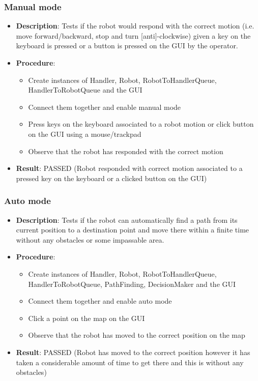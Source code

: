 \documentclass[12pt,a4paper]{article}
\begin{document}
	\subsubsection{Manual mode}
	\begin{itemize}
		\item \textbf{Description}:	Tests if the robot would respond with the correct motion (i.e. move forward/backward, stop and turn [anti]-clockwise) given a key on the keyboard is pressed or a button is pressed on the GUI by the operator.
		\item \textbf{Procedure}:
		\begin{itemize}
			\item Create instances of Handler, Robot, RobotToHandlerQueue, HandlerToRobotQueue and the GUI
			\item Connect them together and enable manual mode
			\item Press keys on the keyboard associated to a robot motion or click button on the GUI using a mouse/trackpad
			\item Observe that the robot has responded with the correct motion
		\end{itemize}
		\item \textbf{Result}:		PASSED (Robot responded with correct motion associated to a pressed key on the keyboard or a clicked button on the GUI)
	\end{itemize}
	
	\subsubsection{Auto mode}
	\begin{itemize}
		\item \textbf{Description}:	Tests if the robot can automatically find a path from its current position to a destination point and move there within a finite time without any obstacles or some impassable area.
		\item \textbf{Procedure}:
		\begin{itemize}
			\item Create instances of Handler, Robot, RobotToHandlerQueue, HandlerToRobotQueue, PathFinding, DecisionMaker and the GUI
			\item Connect them together and enable auto mode
			\item Click a point on the map on the GUI
			\item Observe that the robot has moved to the correct position on the map
		\end{itemize}
		\item \textbf{Result}:		PASSED (Robot has moved to the correct position however it has taken a considerable amount of time to get there and this is without any obstacles)
	\end{itemize}
	
\end{document}

